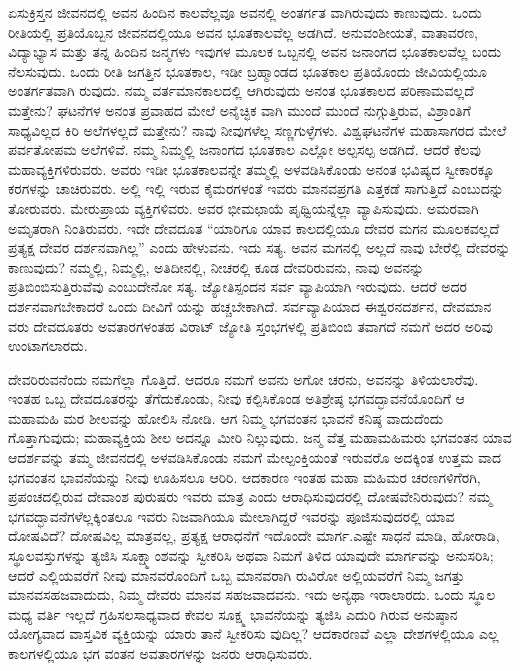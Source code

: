 ಏಸುಕ್ರಿಸ್ತನ ಜೀವನದಲ್ಲಿ ಅವನ ಹಿಂದಿನ ಕಾಲವೆಲ್ಲವೂ ಅವನಲ್ಲಿ ಅಂತರ್ಗತ ವಾಗಿರುವುದು ಕಾಣುವುದು. ಒಂದು ರೀತಿಯಲ್ಲಿ ಪ್ರತಿಯೊಬ್ಬನ ಜೀವನದಲ್ಲಿಯೂ ಅವನ ಭೂತಕಾಲವೆಲ್ಲ ಅಡಗಿದೆ. ಅನುವಂಶೀಯತೆ, ವಾತಾವರಣ, ವಿದ್ಯಾಭ್ಯಾಸ ಮತ್ತು ತನ್ನ ಹಿಂದಿನ ಜನ್ಮಗಳು ಇವುಗಳ ಮೂಲಕ ಒಬ್ಬನಲ್ಲಿ ಅವನ ಜನಾಂಗದ ಭೂತಕಾಲವೆಲ್ಲ ಬಂದು ನೆಲಸುವುದು. ಒಂದು ರೀತಿ ಜಗತ್ತಿನ ಭೂತಕಾಲ, ಇಡೀ ಬ್ರಹ್ಮಾಂಡದ ಭೂತಕಾಲ ಪ್ರತಿಯೊಂದು ಜೀವಿಯಲ್ಲಿಯೂ ಅಂತರ್ಗತವಾಗಿ ರುವುದು. ನಮ್ಮ ವರ್ತಮಾನಕಾಲದಲ್ಲಿ ಆಗಿರುವುದು ಅನಂತ ಭೂತಕಾಲದ ಪರಿಣಾಮವಲ್ಲದೆ ಮತ್ತೇನು? ಘಟನೆಗಳ ಅನಂತ ಪ್ರವಾಹದ ಮೇಲೆ ಅನೈಚ್ಛಿಕ ವಾಗಿ ಮುಂದೆ ಮುಂದೆ ನುಗ್ಗುತ್ತಿರುವ, ವಿಶ್ರಾಂತಿಗೆ ಸಾಧ್ಯವಿಲ್ಲದ ಕಿರಿ ಅಲೆಗಳಲ್ಲದೆ ಮತ್ತೇನು? ನಾವು ನೀವುಗಳೆಲ್ಲ ಸಣ್ಣಗುಳ್ಳೆಗಳು. ವಿಶ್ವಘಟನೆಗಳ ಮಹಾಸಾಗರದ ಮೇಲೆ ಪರ್ವತೋಪಮ ಅಲೆಗಳಿವೆ. ನಮ್ಮ ನಿಮ್ಮಲ್ಲಿ ಜನಾಂಗದ ಭೂತಕಾಲ ಎಲ್ಲೋ ಅಲ್ಪಸಲ್ಪ ಅಡಗಿದೆ. ಆದರೆ ಕೆಲವು ಮಹಾವ್ಯಕ್ತಿಗಳಿರುವರು. ಅವರು ಇಡೀ ಭೂತಕಾಲವನ್ನೇ ತಮ್ಮಲ್ಲಿ ಅಳವಡಿಸಿಕೊಂಡು ಅನಂತ ಭವಿಷ್ಯದ ಸ್ವೀಕಾರಕ್ಕೂ ಕರಗಳನ್ನು ಚಾಚಿರುವರು. ಅಲ್ಲಿ ಇಲ್ಲಿ ಇರುವ ಕೈಮರಗಳಂತೆ ಇವರು ಮಾನವಪ್ರಗತಿ ಎತ್ತಕಡೆ ಸಾಗುತ್ತಿದೆ ಎಂಬುದನ್ನು ತೋರುವರು. ಮೇರುಪ್ರಾಯ ವ್ಯಕ್ತಿಗಳಿವರು. ಅವರ ಭೀಮಛಾಯೆ ಪೃಥ್ವಿಯನ್ನೆಲ್ಲಾ ವ್ಯಾಪಿಸುವುದು. ಅಮರವಾಗಿ ಅಮೃತರಾಗಿ ನಿಂತಿರುವರು. ಇದೇ ದೇವದೂತ “ಯಾರಿಗೂ ಯಾವ ಕಾಲದಲ್ಲಿಯೂ ದೇವರ ಮಗನ ಮೂಲಕವಲ್ಲದೆ ಪ್ರತ್ಯಕ್ಷ ದೇವರ ದರ್ಶನವಾಗಿಲ್ಲ” ಎಂದು ಹೇಳುವನು. ಇದು ಸತ್ಯ. ಅವನ ಮಗನಲ್ಲಿ ಅಲ್ಲದೆ ನಾವು ಬೇರೆಲ್ಲಿ ದೇವರನ್ನು ಕಾಣುವುದು? ನಮ್ಮಲ್ಲಿ, ನಿಮ್ಮಲ್ಲಿ, ಅತಿದೀನಲ್ಲಿ, ನೀಚರಲ್ಲಿ ಕೂಡ ದೇವರಿರುವನು, ನಾವು ಅವನನ್ನು ಪ್ರತಿಬಿಂಬಿಸುತ್ತಿರುವೆವು ಎಂಬುದೇನೋ ಸತ್ಯ. ಜ್ಯೋತಿಸ್ಪಂದನ ಸರ್ವ ವ್ಯಾಪಿಯಾಗಿ ಇರುವುದು. ಆದರೆ ಅದರ ದರ್ಶನವಾಗಬೇಕಾದರೆ ಒಂದು ದೀವಿಗೆ ಯನ್ನು ಹಚ್ಚಬೇಕಾಗಿದೆ. ಸರ್ವವ್ಯಾಪಿಯಾದ ಈಶ್ವರನದರ್ಶನ, ದೇವಮಾನ ವರು ದೇವದೂತರು ಅವತಾರಗಳಂತಹ ವಿರಾಟ್​ ಜ್ಯೋತಿ ಸ್ತಂಭಗಳಲ್ಲಿ ಪ್ರತಿಬಿಂಬಿ ತವಾಗದೆ ನಮಗೆ ಅದರ ಅರಿವು ಉಂಟಾಗಲಾರದು.

ದೇವರಿರುವನೆಂದು ನಮಗೆಲ್ಲಾ ಗೊತ್ತಿದೆ. ಆದರೂ ನಮಗೆ ಅವನು ಅಗೋ ಚರನು, ಅವನನ್ನು ತಿಳಿಯಲಾರೆವು. ಇಂತಹ ಒಬ್ಬ ದೇವದೂತರನ್ನು ತೆಗೆದುಕೊಂಡು, ನೀವು ಕಲ್ಪಿಸಿಕೊಂಡ ಅತಿಶ್ರೇಷ್ಠ ಭಗವದ್ಭಾವನೆಯೊಂದಿಗೆ ಆ ಮಹಾಮಹಿ ಮರ ಶೀಲವನ್ನು ಹೋಲಿಸಿ ನೋಡಿ. ಆಗ ನಿಮ್ಮ ಭಗವಂತನ ಭಾವನೆ ಕನಿಷ್ಠ ವಾದುದೆಂದು ಗೊತ್ತಾಗುವುದು; ಮಹಾವ್ಯಕ್ತಿಯ ಶೀಲ ಅದನ್ನೂ ಮೀರಿ ನಿಲ್ಲುವುದು. ಜನ್ಮ ವೆತ್ತ ಮಹಾಮಹಿಮರು ಭಗವಂತನ ಯಾವ ಆದರ್ಶವನ್ನು ತಮ್ಮ ಜೀವನದಲ್ಲಿ ಅಳವಡಿಸಿಕೊಂಡು ನಮಗೆ ಮೇಲ್ಪಂಕ್ತಿಯಂತೆ ಇರುವರೊ ಅದಕ್ಕಿಂತ ಉತ್ತಮ ವಾದ ಭಗವಂತನ ಭಾವನೆಯನ್ನು ನೀವು ಊಹಿಸಲೂ ಆರಿರಿ. ಆದಕಾರಣ ಇಂತಹ ಮಹಾ ಮಹಿಮರ ಚರಣಗಳಿಗೆರಗಿ, ಪ್ರಪಂಚದಲ್ಲಿರುವ ದೇವಾಂಶ ಪುರುಷರು ಇವರು ಮಾತ್ರ ಎಂದು ಆರಾಧಿಸುವುದರಲ್ಲಿ ದೋಷವೇನಿರುವುದು? ನಮ್ಮ ಭಗವದ್ಭಾವನೆಗಳೆಲ್ಲಕ್ಕಿಂತಲೂ ಇವರು ನಿಜವಾಗಿಯೂ ಮೇಲಾಗಿದ್ದರೆ ಇವರನ್ನು ಪೂಜಿಸುವುದರಲ್ಲಿ ಯಾವ ದೋಷವಿದೆ? ದೋಷವಿಲ್ಲ ಮಾತ್ರವಲ್ಲ, ಪ್ರತ್ಯಕ್ಷ ಆರಾಧನೆಗೆ ಇದೊಂದೇ ಮಾರ್ಗ.ಎಷ್ಟೇ ಸಾಧನೆ ಮಾಡಿ, ಹೋರಾಡಿ, ಸ್ಥೂಲವಸ್ತುಗಳನ್ನು ತ್ಯಜಿಸಿ ಸೂಕ್ಷ್ಮಾಂಶವನ್ನು ಸ್ವೀಕರಿಸಿ ಅಥವಾ ನಿಮಗೆ ತಿಳಿದ ಯಾವುದೇ ಮಾರ್ಗವನ್ನು ಅನುಸರಿಸಿ; ಆದರೆ ಎಲ್ಲಿಯವರೆಗೆ ನೀವು ಮಾನವರೊಂದಿಗೆ ಒಬ್ಬ ಮಾನವರಾಗಿ ರುವಿರೋ ಅಲ್ಲಿಯವರೆಗೆ ನಿಮ್ಮ ಜಗತ್ತು ಮಾನವಸಹಜವಾದುದು, ನಿಮ್ಮ ದೇವರು ಮಾನವ ಸಹಜವಾದವನು. ಇದು ಅನ್ಯಥಾ ಇರಾಲಾರದು. ಒಂದು ಸ್ಥೂಲ ಮಧ್ಯ ವರ್ತಿ ಇಲ್ಲದೆ ಗ್ರಹಿಸಲಸಾಧ್ಯವಾದ ಕೇವಲ ಸೂಕ್ಷ್ಮ ಭಾವನೆಯನ್ನು ತ್ಯಜಿಸಿ ಎದುರಿ ಗಿರುವ ಅನುಷ್ಠಾನ ಯೋಗ್ಯವಾದ ವಾಸ್ತವಿಕ ವ್ಯಕ್ತಿಯನ್ನು ಯಾರು ತಾನೆ ಸ್ವೀಕರಿಸು ವುದಿಲ್ಲ? ಆದಕಾರಣವೆ ಎಲ್ಲಾ ದೇಶಗಳಲ್ಲಿಯೂ ಎಲ್ಲ ಕಾಲಗಳಲ್ಲಿಯೂ ಭಗ ವಂತನ ಅವತಾರಗಳನ್ನು ಜನರು ಆರಾಧಿಸುವರು.

